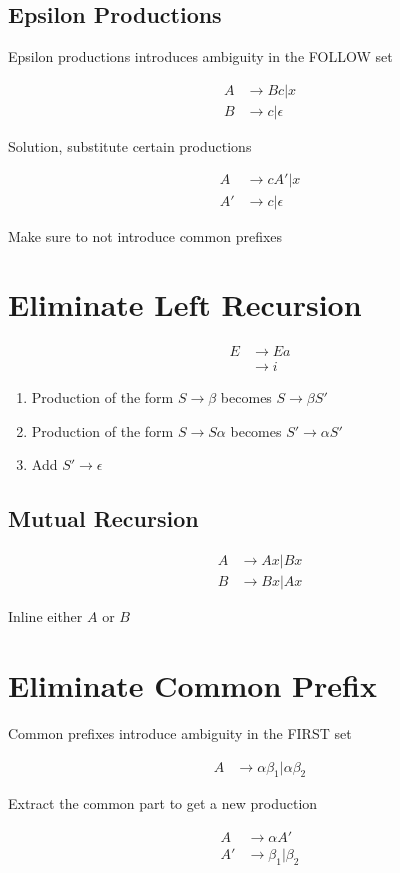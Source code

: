   \subsection{Epsilon Productions}

    Epsilon productions introduces ambiguity in the FOLLOW set

    \begin{align*}
      A &\to Bc | x \\
      B &\to c | \epsilon
    \end{align*}

    Solution, substitute certain productions

    \begin{align*}
      A &\to c A' | x \\
      A' &\to c | \epsilon
    \end{align*}

    Make sure to not introduce common prefixes

\section{Eliminate Left Recursion}
\label{section: grammar/eliminate left recursion}

  \begin{align*}
    E &\to Ea \\
    &\to i
  \end{align*}

  \begin{enumerate}
    \item Production of the form $ S \to \beta $ becomes $ S \to \beta S' $
    \item Production of the form $ S \to S \alpha $ becomes $ S' \to \alpha S' $
    \item Add $ S' \to \epsilon $
  \end{enumerate}

  \subsection{Mutual Recursion}

    \begin{align*}
      A &\to Ax | Bx \\
      B &\to Bx | Ax
    \end{align*}

    Inline either $ A $ or $ B $

\section{Eliminate Common Prefix}
\label{section: grammar/eliminate common prefix}

  Common prefixes introduce ambiguity in the FIRST set

  \begin{align*}
    A &\to \alpha \beta_{1} | \alpha \beta_{2}
  \end{align*}

  Extract the common part to get a new production

  \begin{align*}
    A &\to \alpha A' \\
    A' &\to \beta_{1} | \beta_{2}
  \end{align*}
